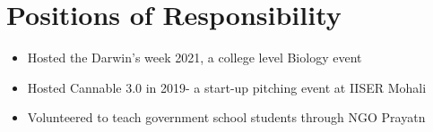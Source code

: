 \newcommand{\por}[3]{\textbf{#1}, #2 \hfill #3}

\section*{Positions of Responsibility}
\begin{itemize}

\setlength\itemsep{0pt}
\item Hosted the Darwin's week 2021, a college level Biology event
\item Hosted Cannable 3.0 in 2019- a start-up pitching event at IISER Mohali
\item Volunteered to teach government school students through NGO Prayatn

\end{itemize}
